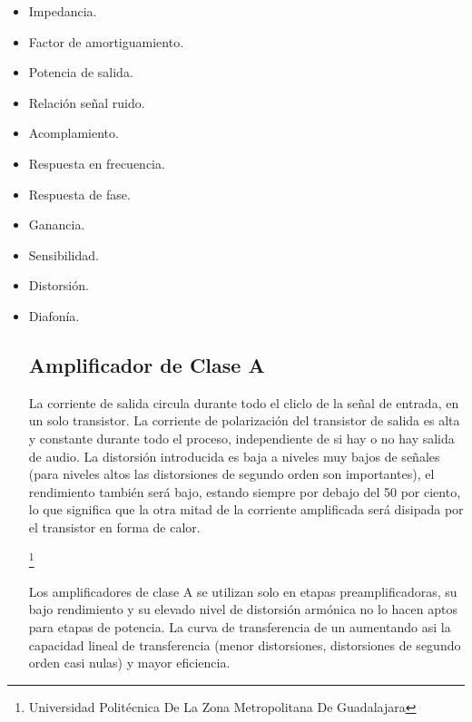 \documentclass[11pt,a4paper]{article}
\begin{document}
\begin{itemize}

\item Impedancia.\\
\item Factor de amortiguamiento.\\
\item Potencia de salida.\\
\item Relación señal ruido.\\
\item Acomplamiento.\\
\item Respuesta en frecuencia.\\
\item Respuesta de fase.\\
\item Ganancia.\\
\item Sensibilidad.\\
\item Distorsión.\\
\item Diafonía.\\

\subsection{Amplificador de Clase A}

La corriente de salida circula durante todo el cliclo de la señal de entrada, en un solo transistor. La corriente de polarización del transistor de salida es alta y constante durante todo el proceso, independiente de si hay o no hay salida de audio. La distorsión introducida es baja a niveles muy bajos de señales (para niveles altos las distorsiones de segundo orden son importantes), el rendimiento también será bajo, estando siempre por debajo del 50 por ciento, lo que significa que la otra mitad de la corriente amplificada será disipada por el transistor en forma de calor. 

\footnote{Universidad Politécnica De La Zona Metropolitana De Guadalajara} 

\newpage

Los amplificadores de clase A se utilizan solo en etapas preamplificadoras, su bajo rendimiento y su elevado nivel de distorsión armónica no lo hacen aptos para etapas de potencia. La curva de transferencia de un aumentando asi la capacidad lineal de transferencia (menor distorsiones, distorsiones de segundo orden casi nulas) y mayor eficiencia.


\end{itemize}
\end{document}
